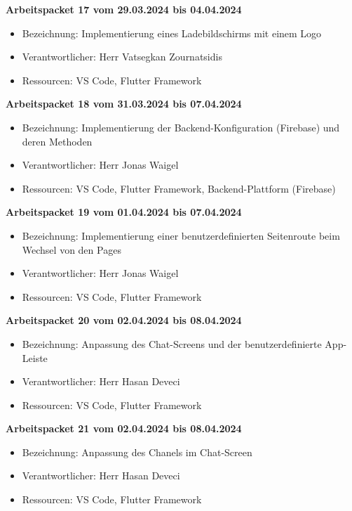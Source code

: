 \textbf{Arbeitspacket 17 vom 29.03.2024 bis 04.04.2024}
\begin{itemize}[itemsep=0pt]
	\item{Bezeichnung: Implementierung eines Ladebildschirms mit einem Logo}
	\item{Verantwortlicher: Herr Vatsegkan Zournatsidis} 
	\item{Ressourcen: VS Code, Flutter Framework} 
\end{itemize}

\textbf{Arbeitspacket 18 vom 31.03.2024 bis 07.04.2024}
\begin{itemize}[itemsep=0pt]
	\item{Bezeichnung: Implementierung der Backend-Konfiguration (Firebase) und deren Methoden}
	\item{Verantwortlicher: Herr Jonas Waigel} 
	\item{Ressourcen: VS Code, Flutter Framework, Backend-Plattform (Firebase)} 
\end{itemize}

\newpage
\textbf{Arbeitspacket 19 vom 01.04.2024 bis 07.04.2024}
\begin{itemize}[itemsep=0pt]
	\item{Bezeichnung: Implementierung einer benutzerdefinierten Seitenroute beim Wechsel von den Pages}
	\item{Verantwortlicher: Herr Jonas Waigel} 
	\item{Ressourcen: VS Code, Flutter Framework} 
\end{itemize} 

\textbf{Arbeitspacket 20 vom 02.04.2024 bis 08.04.2024}
\begin{itemize}[itemsep=0pt]
	\item{Bezeichnung: Anpassung des Chat-Screens und der benutzerdefinierte App-Leiste}
	\item{Verantwortlicher: Herr Hasan Deveci} 
	\item{Ressourcen: VS Code, Flutter Framework} 
\end{itemize}

\textbf{Arbeitspacket 21 vom 02.04.2024 bis 08.04.2024}
\begin{itemize}[itemsep=0pt]
	\item{Bezeichnung: Anpassung des Chanels im Chat-Screen}
	\item{Verantwortlicher: Herr Hasan Deveci} 
	\item{Ressourcen: VS Code, Flutter Framework} 
\end{itemize}

